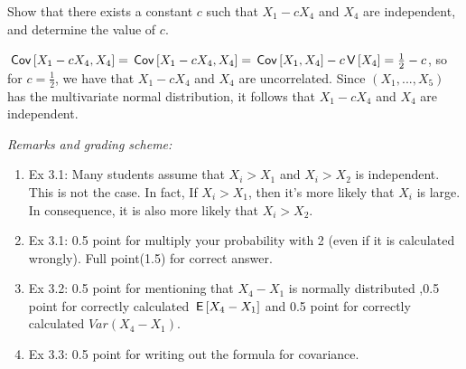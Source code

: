 \begin{exercise}[1]
Show that there exists a constant $c$ such that $X_1 - c X_4$ and $X_4$ are independent, and determine the value of $c$. 
\begin{solution}
  $\,\mathsf{Cov}\left[X_1 - c X_4, X_4\right] = \,\mathsf{Cov}\left[X_1 - c X_4, X_4\right] = \,\mathsf{Cov}\left[X_1, X_4\right] - c\,\mathsf{V}\left[X_4\right] = \tfrac12- c$, so for $c = \tfrac12$, we have that $X_1 - c X_4$ and $X_4$ are uncorrelated. Since $(X_1,...,X_5)$ has the multivariate normal distribution, it follows that $X_1 - c X_4$ and $X_4$ are independent.
\end{solution}
\end{exercise}


\noindent \textit{Remarks and grading scheme:}
\begin{enumerate}
    \item Ex 3.1: Many students assume that $X_i>X_1$ and $X_i>X_2$ is independent. This is not the case. In fact,  If $X_i > X_1$, then it's more likely that $X_i$ is large. In consequence, it is also more likely that $X_i > X_2$.
    \item Ex 3.1: 0.5 point for multiply your probability with 2 (even if it is calculated wrongly). Full point(1.5) for correct answer.
    \item Ex 3.2: 0.5 point for mentioning that $X_4-X_1$ is normally distributed ,0.5 point for correctly calculated $\,\mathsf{E}\left[X_4-X_1\right]$ and 0.5 point for correctly calculated $Var(X_4-X_1)$.
    \item Ex 3.3: 0.5 point for writing out the formula for covariance.
\end{enumerate}
